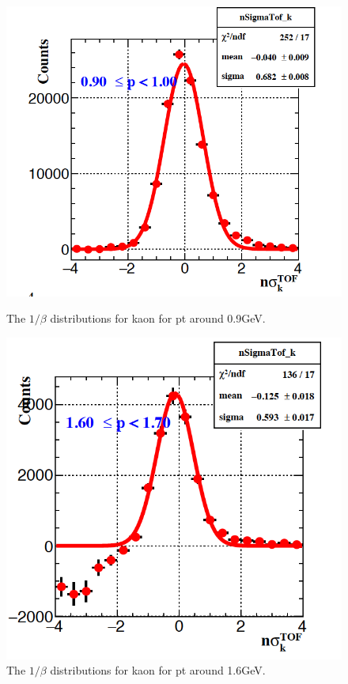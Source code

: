 \begin{figure}[htbp]
\begin{minipage}[htbp]{0.5\linewidth}
\centering
\includegraphics[width=1.0\textwidth]{figure/Run14_D0HFT/nsigmaK_tof_1_2.png}
\caption{The $1/\beta$ distributions for kaon for pt around 0.9GeV. \label{fig:kaon_1beta1_2}}
\end{minipage}
\hfill
\begin{minipage}[htbp]{0.5\linewidth}
\centering
\includegraphics[width=1.0\textwidth]{figure/Run14_D0HFT/nsigmaK_tof_2_2.png}
\caption{The $1/\beta$ distributions for kaon for pt around 1.6GeV. \label{fig:kaon_1beta2_2}}
\end{minipage}
\end{figure}


